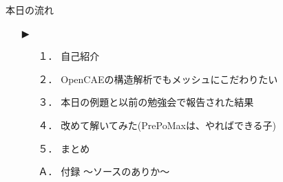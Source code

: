 \begin{frame}{本日の流れ}
  \begin{itemize}
     \item[▶] 
     \begin{itemize}[itemsep=1.3ex, leftmargin=1cm]
       \item[１．] 自己紹介
       \item[２．] OpenCAEの構造解析でもメッシュにこだわりたい
       \item[３．] 本日の例題と以前の勉強会で報告された結果
       \item[４．] 改めて解いてみた(PrePoMaxは、やればできる子)
       \item[５．] まとめ
       \item[Ａ．] 付録 ～ソースのありか～
    \end{itemize}
  \end{itemize}
\end{frame}
